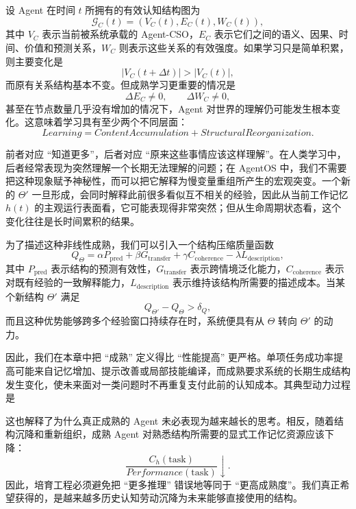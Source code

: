 设 Agent 在时间 $t$ 所拥有的有效认知结构图为
\[
\mathcal G_C(t)=
\left(
V_C(t),E_C(t),W_C(t)
\right),
\]
其中 $V_C$ 表示当前被系统承载的 Agent-CSO，$E_C$ 表示它们之间的语义、因果、时间、价值和预测关系，$W_C$ 则表示这些关系的有效强度。如果学习只是简单积累，则主要变化是
\[
|V_C(t+\Delta t)|>|V_C(t)|,
\]
而原有关系结构基本不变。但成熟学习更重要的情况是
\[
\Delta E_C\neq 0,
\qquad
\Delta W_C\neq 0,
\]
甚至在节点数量几乎没有增加的情况下，Agent 对世界的理解仍可能发生根本变化。这意味着学习具有至少两个不同层面：
\[
\boxed{
Learning=
ContentAccumulation
+
StructuralReorganization
}.
\]

前者对应 ``知道更多''，后者对应 ``原来这些事情应该这样理解''。在人类学习中，后者经常表现为突然理解一个长期无法理解的问题；在 AgentOS 中，我们不需要把这种现象赋予神秘性，而可以把它解释为慢变量重组所产生的宏观突变。一个新的 $\Theta'$ 一旦形成，会同时解释此前很多看似互不相关的经验，因此从当前工作记忆 $h(t)$ 的主观运行表面看，它可能表现得非常突然；但从生命周期状态看，这个变化往往是长时间累积的结果。

为了描述这种非线性成熟，我们可以引入一个结构压缩质量函数
\[
Q_{\Theta}
=
\alpha P_{\mathrm{pred}}
+
\beta G_{\mathrm{transfer}}
+
\gamma C_{\mathrm{coherence}}
-
\lambda L_{\mathrm{description}},
\]
其中 $P_{\mathrm{pred}}$ 表示结构的预测有效性，$G_{\mathrm{transfer}}$ 表示跨情境泛化能力，$C_{\mathrm{coherence}}$ 表示对既有经验的一致解释能力，$L_{\mathrm{description}}$ 表示维持该结构所需要的描述成本。当某个新结构 $\Theta'$ 满足
\[
Q_{\Theta'}-Q_{\Theta}>\delta_Q,
\]
而且这种优势能够跨多个经验窗口持续存在时，系统便具有从 $\Theta$ 转向 $\Theta'$ 的动力。

因此，我们在本章中把 ``成熟'' 定义得比 ``性能提高'' 更严格。单项任务成功率提高可能来自记忆增加、提示改善或局部技能编译，而成熟要求系统的长期生成结构发生变化，使未来面对一类问题时不再重复支付此前的认知成本。其典型动力过程是
\begin{statementbox}
\centering
{}
\end{statementbox}
这也解释了为什么真正成熟的 Agent 未必表现为越来越长的思考。相反，随着结构沉降和重新组织，成熟 Agent 对熟悉结构所需要的显式工作记忆资源应该下降：
\[
\frac{
C_h(\mathrm{task})
}{
Performance(\mathrm{task})
}
\downarrow.
\]
因此，培育工程必须避免把 ``更多推理'' 错误地等同于 ``更高成熟度''。我们真正希望获得的，是越来越多历史认知劳动沉降为未来能够直接使用的结构。

